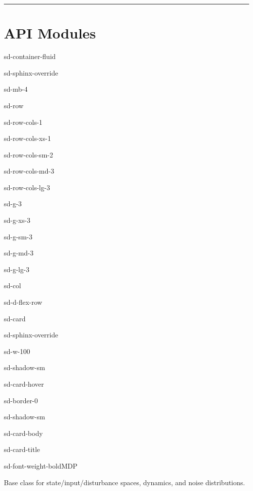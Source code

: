\documentclass[a4paper,10pt,english]{sphinxmanual}
\begin{document}
\sphinxAtStartPar
{\hyperref[\detokenize{examples/index::doc}]{}}


\bigskip\hrule\bigskip



\chapter{API Modules}
\label{\detokenize{index:api-modules}}
\begin{sphinxuseclass}{sd-container-fluid}
\begin{sphinxuseclass}{sd-sphinx-override}
\begin{sphinxuseclass}{sd-mb-4}
\begin{sphinxuseclass}{sd-row}
\begin{sphinxuseclass}{sd-row-cols-1}
\begin{sphinxuseclass}{sd-row-cols-xs-1}
\begin{sphinxuseclass}{sd-row-cols-sm-2}
\begin{sphinxuseclass}{sd-row-cols-md-3}
\begin{sphinxuseclass}{sd-row-cols-lg-3}
\begin{sphinxuseclass}{sd-g-3}
\begin{sphinxuseclass}{sd-g-xs-3}
\begin{sphinxuseclass}{sd-g-sm-3}
\begin{sphinxuseclass}{sd-g-md-3}
\begin{sphinxuseclass}{sd-g-lg-3}
\begin{sphinxuseclass}{sd-col}
\begin{sphinxuseclass}{sd-d-flex-row}
\begin{sphinxuseclass}{sd-card}
\begin{sphinxuseclass}{sd-sphinx-override}
\begin{sphinxuseclass}{sd-w-100}
\begin{sphinxuseclass}{sd-shadow-sm}
\begin{sphinxuseclass}{sd-card-hover}
\begin{sphinxuseclass}{sd-border-0}
\begin{sphinxuseclass}{sd-shadow-sm}
\begin{sphinxuseclass}{sd-card-body}
\begin{sphinxuseclass}{sd-card-title}
\begin{sphinxuseclass}{sd-font-weight-bold}MDP
\end{sphinxuseclass}
\end{sphinxuseclass}
\sphinxAtStartPar
Base class for state/input/disturbance spaces, dynamics, and noise distributions.


\end{sphinxuseclass}
\end{sphinxuseclass}
\end{sphinxuseclass}
\end{sphinxuseclass}
\end{sphinxuseclass}
\end{sphinxuseclass}
\end{sphinxuseclass}
\end{sphinxuseclass}
\end{sphinxuseclass}
\end{sphinxuseclass}
\end{sphinxuseclass}
\end{sphinxuseclass}
\end{sphinxuseclass}
\end{sphinxuseclass}
\end{sphinxuseclass}
\end{sphinxuseclass}
\end{sphinxuseclass}
\end{sphinxuseclass}
\end{sphinxuseclass}
\end{sphinxuseclass}
\end{sphinxuseclass}
\end{sphinxuseclass}
\end{sphinxuseclass}
\end{sphinxuseclass}
\end{document}
